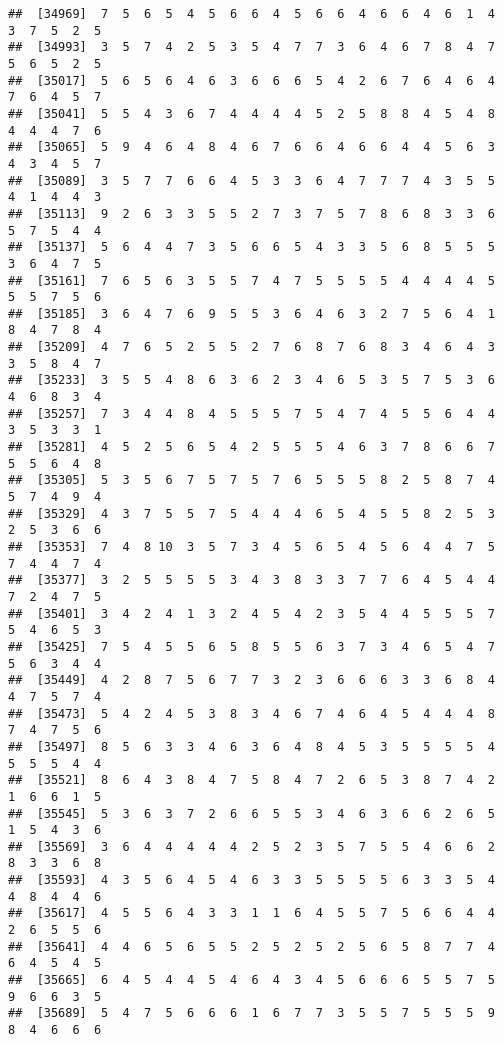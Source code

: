 \documentclass[
]{book}
\begin{document}
\begin{verbatim}
##  [34969]  7  5  6  5  4  5  6  6  4  5  6  6  4  6  6  4  6  1  4  3  7  5  2  5
##  [34993]  3  5  7  4  2  5  3  5  4  7  7  3  6  4  6  7  8  4  7  5  6  5  2  5
##  [35017]  5  6  5  6  4  6  3  6  6  6  5  4  2  6  7  6  4  6  4  7  6  4  5  7
##  [35041]  5  5  4  3  6  7  4  4  4  4  5  2  5  8  8  4  5  4  8  4  4  4  7  6
##  [35065]  5  9  4  6  4  8  4  6  7  6  6  4  6  6  4  4  5  6  3  4  3  4  5  7
##  [35089]  3  5  7  7  6  6  4  5  3  3  6  4  7  7  7  4  3  5  5  4  1  4  4  3
##  [35113]  9  2  6  3  3  5  5  2  7  3  7  5  7  8  6  8  3  3  6  5  7  5  4  4
##  [35137]  5  6  4  4  7  3  5  6  6  5  4  3  3  5  6  8  5  5  5  3  6  4  7  5
##  [35161]  7  6  5  6  3  5  5  7  4  7  5  5  5  5  4  4  4  4  5  5  5  7  5  6
##  [35185]  3  6  4  7  6  9  5  5  3  6  4  6  3  2  7  5  6  4  1  8  4  7  8  4
##  [35209]  4  7  6  5  2  5  5  2  7  6  8  7  6  8  3  4  6  4  3  3  5  8  4  7
##  [35233]  3  5  5  4  8  6  3  6  2  3  4  6  5  3  5  7  5  3  6  4  6  8  3  4
##  [35257]  7  3  4  4  8  4  5  5  5  7  5  4  7  4  5  5  6  4  4  3  5  3  3  1
##  [35281]  4  5  2  5  6  5  4  2  5  5  5  4  6  3  7  8  6  6  7  5  5  6  4  8
##  [35305]  5  3  5  6  7  5  7  5  7  6  5  5  5  8  2  5  8  7  4  5  7  4  9  4
##  [35329]  4  3  7  5  5  7  5  4  4  4  6  5  4  5  5  8  2  5  3  2  5  3  6  6
##  [35353]  7  4  8 10  3  5  7  3  4  5  6  5  4  5  6  4  4  7  5  7  4  4  7  4
##  [35377]  3  2  5  5  5  5  3  4  3  8  3  3  7  7  6  4  5  4  4  7  2  4  7  5
##  [35401]  3  4  2  4  1  3  2  4  5  4  2  3  5  4  4  5  5  5  7  5  4  6  5  3
##  [35425]  7  5  4  5  5  6  5  8  5  5  6  3  7  3  4  6  5  4  7  5  6  3  4  4
##  [35449]  4  2  8  7  5  6  7  7  3  2  3  6  6  6  3  3  6  8  4  4  7  5  7  4
##  [35473]  5  4  2  4  5  3  8  3  4  6  7  4  6  4  5  4  4  4  8  7  4  7  5  6
##  [35497]  8  5  6  3  3  4  6  3  6  4  8  4  5  3  5  5  5  5  4  5  5  5  4  4
##  [35521]  8  6  4  3  8  4  7  5  8  4  7  2  6  5  3  8  7  4  2  1  6  6  1  5
##  [35545]  5  3  6  3  7  2  6  6  5  5  3  4  6  3  6  6  2  6  5  1  5  4  3  6
##  [35569]  3  6  4  4  4  4  4  2  5  2  3  5  7  5  5  4  6  6  2  8  3  3  6  8
##  [35593]  4  3  5  6  4  5  4  6  3  3  5  5  5  5  6  3  3  5  4  4  8  4  4  6
##  [35617]  4  5  5  6  4  3  3  1  1  6  4  5  5  7  5  6  6  4  4  2  6  5  5  6
##  [35641]  4  4  6  5  6  5  5  2  5  2  5  2  5  6  5  8  7  7  4  6  4  5  4  5
##  [35665]  6  4  5  4  4  5  4  6  4  3  4  5  6  6  6  5  5  7  5  9  6  6  3  5
##  [35689]  5  4  7  5  6  6  6  1  6  7  7  3  5  5  7  5  5  5  9  8  4  6  6  6

\end{verbatim}
\end{document}
